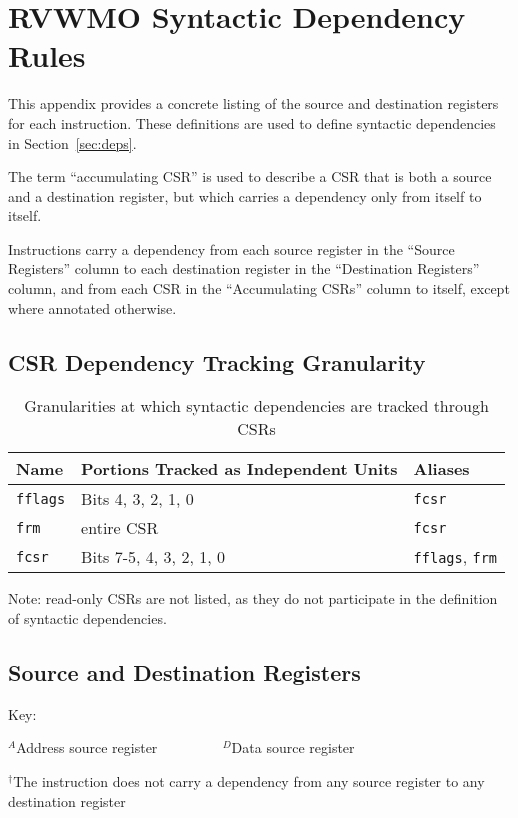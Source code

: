 \chapter{RVWMO Syntactic Dependency Rules}
\label{ch:deps}
This appendix provides a concrete listing of the source and destination registers for each instruction.
These definitions are used to define syntactic dependencies in Section~\ref{sec:deps}.

The term ``accumulating CSR'' is used to describe a CSR that is both a source and a destination register, but which carries a dependency only from itself to itself.

Instructions carry a dependency from each source register in the ``Source Registers'' column to each destination register in the ``Destination Registers'' column, and from each CSR in the ``Accumulating CSRs'' column to itself, except where annotated otherwise.

\section{CSR Dependency Tracking Granularity}

\begin{table}[h!]
  \centering
  \begin{tabular}{|l|l|l|}
    \hline
    Name & Portions Tracked as Independent Units & Aliases  \\
    \hline
    {\tt fflags} & Bits 4, 3, 2, 1, 0 & {\tt fcsr}  \\
    \hline
    {\tt frm} & entire CSR & {\tt fcsr} \\
    \hline
    {\tt fcsr} & Bits 7-5, 4, 3, 2, 1, 0 & {\tt fflags}, {\tt frm} \\
    \hline
  \end{tabular}
  \caption{Granularities at which syntactic dependencies are tracked through CSRs}
\end{table}

Note: read-only CSRs are not listed, as they do not participate in the definition of syntactic dependencies.

\section{Source and Destination Registers}

Key:

$^A$Address source register ~~~~~~~~ $^D$Data source register

$^\dagger$The instruction does not carry a dependency from any source register to any destination register

